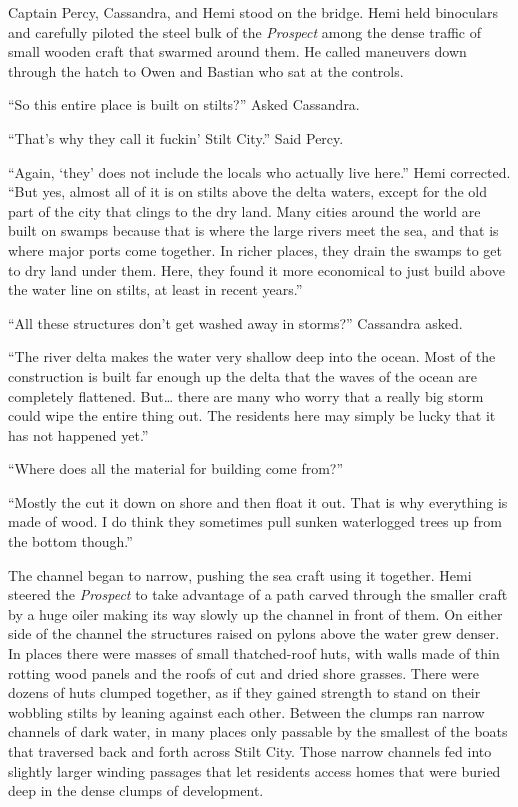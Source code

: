 \documentclass[
]{scrbook}
\begin{document}
Captain Percy, Cassandra, and Hemi stood on the bridge. Hemi held
binoculars and carefully piloted the steel bulk of the \emph{Prospect}
among the dense traffic of small wooden craft that swarmed around them.
He called maneuvers down through the hatch to Owen and Bastian who sat
at the controls.

``So this entire place is built on stilts?'' Asked Cassandra.

``That's why they call it fuckin' Stilt City.'' Said Percy.

``Again, `they' does not include the locals who actually live here.''
Hemi corrected. ``But yes, almost all of it is on stilts above the delta
waters, except for the old part of the city that clings to the dry land.
Many cities around the world are built on swamps because that is where
the large rivers meet the sea, and that is where major ports come
together. In richer places, they drain the swamps to get to dry land
under them. Here, they found it more economical to just build above the
water line on stilts, at least in recent years.''

``All these structures don't get washed away in storms?'' Cassandra
asked.

``The river delta makes the water very shallow deep into the ocean. Most
of the construction is built far enough up the delta that the waves of
the ocean are completely flattened. But\ldots{} there are many who worry
that a really big storm could wipe the entire thing out. The residents
here may simply be lucky that it has not happened yet.''

``Where does all the material for building come from?''

``Mostly the cut it down on shore and then float it out. That is why
everything is made of wood. I do think they sometimes pull sunken
waterlogged trees up from the bottom though.''

The channel began to narrow, pushing the sea craft using it together.
Hemi steered the \emph{Prospect} to take advantage of a path carved
through the smaller craft by a huge oiler making its way slowly up the
channel in front of them. On either side of the channel the structures
raised on pylons above the water grew denser. In places there were
masses of small thatched-roof huts, with walls made of thin rotting wood
panels and the roofs of cut and dried shore grasses. There were dozens
of huts clumped together, as if they gained strength to stand on their
wobbling stilts by leaning against each other. Between the clumps ran
narrow channels of dark water, in many places only passable by the
smallest of the boats that traversed back and forth across Stilt City.
Those narrow channels fed into slightly larger winding passages that let
residents access homes that were buried deep in the dense clumps of
development.
\end{document}
